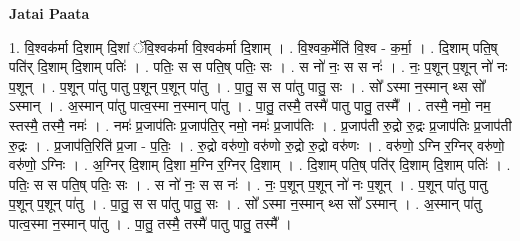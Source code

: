 \documentclass[17pt]{extarticle}
\begin{document}
\textbf{Jatai Paata} \newline

1. वि॒श्वक॑र्मा दि॒शाम् दि॒शां ॅवि॒श्वक॑र्मा वि॒श्वक॑र्मा दि॒शाम् । . वि॒श्वक॒र्मेति॑ वि॒श्व - क॒र्मा॒ । . दि॒शाम् पति॒ष् पति॑र् दि॒शाम् दि॒शाम् पतिः॑ । . पतिः॒ स स पति॒ष् पतिः॒ सः । . स नो॑ नः॒ स स नः॑ । . नः॒ प॒शून् प॒शून् नो॑ नः प॒शून् । . प॒शून् पा॑तु पातु प॒शून् प॒शून् पा॑तु । . पा॒तु॒ स स पा॑तु पातु॒ सः । . सो᳚ ऽस्मा न॒स्मान् थ्स सो᳚ ऽस्मान् । . अ॒स्मान् पा॑तु पात्व॒स्मा न॒स्मान् पा॑तु । . पा॒तु॒ तस्मै॒ तस्मै॑ पातु पातु॒ तस्मै᳚ । . तस्मै॒ नमो॒ नम॒ स्तस्मै॒ तस्मै॒ नमः॑ । . नमः॑ प्र॒जाप॑तिः प्र॒जाप॑ति॒र् नमो॒ नमः॑ प्र॒जाप॑तिः । . प्र॒जाप॑ती रु॒द्रो रु॒द्रः प्र॒जाप॑तिः प्र॒जाप॑ती रु॒द्रः । . प्र॒जाप॑ति॒रिति॑ प्र॒जा - प॒तिः॒ । . रु॒द्रो वरु॑णो॒ वरु॑णो रु॒द्रो रु॒द्रो वरु॑णः । . वरु॑णो॒ ऽग्नि र॒ग्निर् वरु॑णो॒ वरु॑णो॒ ऽग्निः । . अ॒ग्निर् दि॒शाम् दि॒शा म॒ग्नि र॒ग्निर् दि॒शाम् । . दि॒शाम् पति॒ष् पति॑र् दि॒शाम् दि॒शाम् पतिः॑ । . पतिः॒ स स पति॒ष् पतिः॒ सः । . स नो॑ नः॒ स स नः॑ । . नः॒ प॒शून् प॒शून् नो॑ नः प॒शून् । . प॒शून् पा॑तु पातु प॒शून् प॒शून् पा॑तु । . पा॒तु॒ स स पा॑तु पातु॒ सः । . सो᳚ ऽस्मा न॒स्मान् थ्स सो᳚ ऽस्मान् । . अ॒स्मान् पा॑तु पात्व॒स्मा न॒स्मान् पा॑तु । . पा॒तु॒ तस्मै॒ तस्मै॑ पातु पातु॒ तस्मै᳚ । \newline
\end{document}
